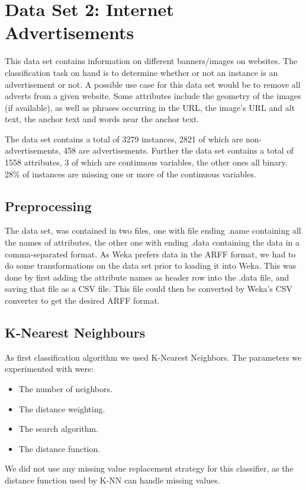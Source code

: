 \documentclass{article}
\begin{document}
\section{Data Set 2: Internet Advertisements}
This data set contains information on different banners/images on websites. The classification task on hand is to determine whether or not an instance is an advertisement or not. A possible use case for this data set would be to remove all adverts from a given website. Some attributes include the geometry of the images (if available), as well as phrases occurring in the URL, the image's URL and alt text, the anchor text and words near the anchor text.

The data set contains a total of 3279 instances, 2821 of which are non-advertisements, 458 are advertisements. Further the data set contains a total of 1558 attributes, 3 of which are continuous variables, the other ones all binary. 28\% of instances are missing one or more of the continuous variables.


\subsection{Preprocessing}
The data set, was contained in two files, one with file ending .name containing all the names of attributes, the other one with ending .data containing the data in a comma-separated format. As Weka prefers data in the ARFF format, we had to do some transformations on the data set prior to loading it into Weka. This was done by first adding the attribute names as header row into the .data file, and saving that file as a CSV file. This file could then be converted by Weka's CSV converter to get the desired ARFF format.

\subsection{K-Nearest Neighbours}
As first classification algorithm we used K-Nearest Neighbors. The parameters we experimented with were:

\begin{itemize}
\item The number of neighbors.
\item The distance weighting.
\item The search algorithm.
\item The distance function.
\end{itemize}

We did not use any missing value replacement strategy for this classifier, as the distance function used by K-NN can handle missing values. 
\end{document}
